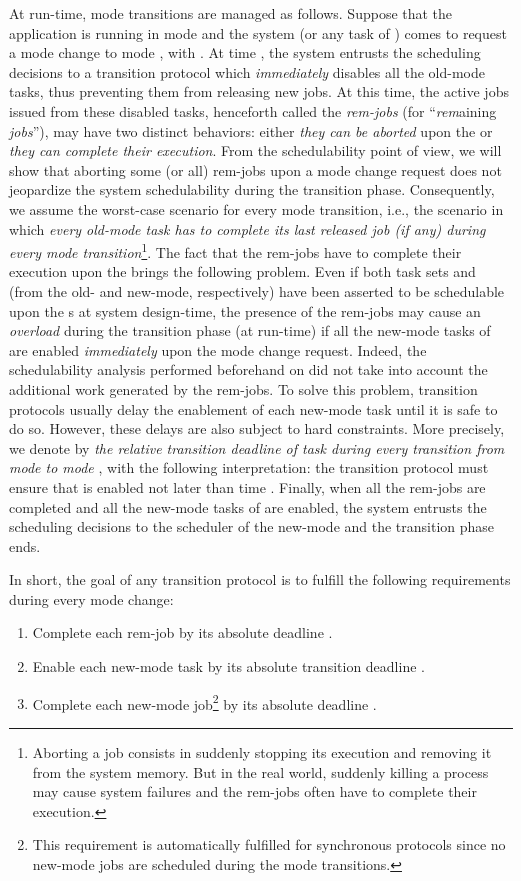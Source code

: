 \documentclass{article}
\newtheorem{validity test}{Validity Test}
\begin{document}
At run-time, mode transitions are managed as follows. Suppose that the application is running in mode  and the system (or any task of ) comes to request a mode change to mode , with . At time , the system entrusts the scheduling decisions to a transition protocol which \emph{immediately} disables all the old-mode tasks, thus preventing them from releasing new jobs. At this time, the active jobs issued from these disabled tasks, henceforth called the \emph{rem-jobs} (for ``\emph{rem}aining \emph{jobs}''), may have two distinct behaviors: either \emph{they can be aborted} upon the  or \emph{they can complete their execution}. From the schedulability point of view, we will show that aborting some (or all) rem-jobs upon a mode change request does not jeopardize the system schedulability during the transition phase. Consequently, we assume the worst-case scenario for every mode transition, i.e., the scenario in which \emph{every old-mode task has to complete its last released job (if any) during every mode transition}\footnote{Aborting a job consists in suddenly stopping its execution and removing it from the system memory. But in the real world, suddenly killing a process may cause system failures and the rem-jobs often have to complete their execution.}. The fact that the rem-jobs have to complete their execution upon the  brings the following problem. Even if both task sets  and  (from the old- and new-mode, respectively) have been asserted to be schedulable upon the  s at system design-time, the presence of the rem-jobs may cause an \emph{overload} during the transition phase (at run-time) if all the new-mode tasks of  are enabled \emph{immediately} upon the mode change request. Indeed, the schedulability analysis performed beforehand on  did not take into account the additional work generated by the rem-jobs. To solve this problem, transition protocols usually delay the enablement of each new-mode task until it is safe to do so. However, these delays are also subject to hard constraints. More precisely, we denote by  \emph{the relative transition deadline of task  during every transition from mode  to mode }, with the following interpretation: the transition protocol must ensure that  is enabled not later than time . Finally, when all the rem-jobs are completed and all the new-mode tasks of  are enabled, the system entrusts the scheduling decisions to the scheduler  of the new-mode  and the transition phase ends. 

In short, the goal of any transition protocol is to fulfill the following requirements during every mode change:
\begin{enumerate}
\item Complete each rem-job  by its absolute deadline .
\item Enable each new-mode task  by its absolute transition deadline .
\item Complete each new-mode job\footnote{This requirement is automatically fulfilled for synchronous protocols since no new-mode jobs are scheduled during the mode transitions.}  by its absolute deadline .

\end{enumerate}
\end{document}
